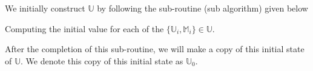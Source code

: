 \documentclass[../../ClusteringConnectionsMAIN.tex]{subfiles}
\begin{document}
\begin{flushleft}
\begin{large}


We initially construct $\mathbb{U}$ by following the sub-routine (sub algorithm) given below

\begin{algorithm}
\caption{Computing the initial value for each of the $\bigl\{ \mathbb{U}_i, \mathbb{M}_i \bigr\} \in \mathbb{U}$.}
\end{algorithm}

After the completion of this sub-routine, we will make a copy of this initial state of $\mathbb{U}$.  We denote this copy of this initial state as $\mathbb{U}_0$.








































\end{large}
\end{flushleft}
\end{document}
